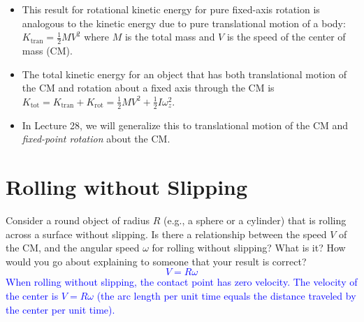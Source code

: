 \documentclass[11pt, letterpaper, openany]{book}
\newenvironment{exercise}[1][Exercise]{%
  \tcolorbox[blanker, breakable, left=1em,
    before skip=1em, after skip=1em,
    borderline west={3pt}{0pt}{PhysNavy},
    colback=PhysCream,
    before upper={\textcolor{PhysNavy}{\sffamily\bfseries #1:}\space}
  ]%
}{%
  \endtcolorbox%
}
\begin{document}
\begin{itemize}
    \item This result for rotational kinetic energy for pure fixed-axis rotation is analogous to the kinetic energy due to pure translational motion of a body: $K_{\text{tran}} = \frac{1}{2}MV^2$ where $M$ is the total mass and $V$ is the speed of the center of mass (CM).
    \item The total kinetic energy for an object that has both translational motion of the CM and rotation about a fixed axis through the CM is $K_{\text{tot}} = K_{\text{tran}} + K_{\text{rot}} = \frac{1}{2}MV^2 + \frac{1}{2}I\omega_z^2$.
    \item In Lecture 28, we will generalize this to translational motion of the CM and \textit{fixed-point rotation} about the CM.
\end{itemize}

\section*{Rolling without Slipping}

\begin{exercise}[Exercise 3]
Consider a round object of radius $R$ (e.g., a sphere or a cylinder) that is rolling across a surface without slipping. Is there a relationship between the speed $V$ of the CM, and the angular speed $\omega$ for rolling without slipping? What is it? How would you go about explaining to someone that your result is correct? \\
\textcolor{blue}{
\[ V = R\omega \]
When rolling without slipping, the contact point has zero velocity. The velocity of the center is $V = R\omega$ (the arc length per unit time equals the distance traveled by the center per unit time).
}
\end{exercise}
\end{document}
